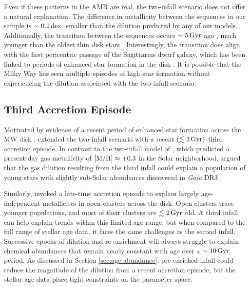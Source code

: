 \documentclass[twocolumn,twocolappendix]{aastex701}
\newcommand{\Gyr}{\,{\rm Gyr}}
\newcommand{\dex}{\,{\rm dex}}
\begin{document}
Even if these patterns in the AMR are real, the two-infall scenario does not offer a natural explanation. The difference in metallicity between the sequences in our sample is $\sim0.2\dex$, smaller than the dilution predicted by any of our models. Additionally, the transition between the sequences occurs $\sim5\Gyr$ ago \citep[matching][]{anders_spectroscopic_2023}, much younger than the oldest thin disk stars \citep{pinsonneault_apokasc-3_2025}. Interestingly, the transition does align with the first pericentric passage of the Sagittarius dwarf galaxy, which has been linked to periods of enhanced star formation in the disk \citep{ruiz-lara_recurrent_2020}. It is possible that the Milky Way has seen multiple episodes of high star formation without experiencing the dilution associated with the two-infall scenario.

\subsection{Third Accretion Episode}

Motivated by evidence of a recent period of enhanced star formation across the MW disk \citep{ruiz-lara_recurrent_2020}, \citet{spitoni_beyond_2023} extended the two-infall scenario with a recent $(\lesssim3\Gyr)$ third accretion episode. In contrast to the two-infall model of \citet{spitoni_apogee_2021}, which predicted a present-day gas metallicity of ${\rm [M/H]}\approx+0.3$ in the Solar neighborhood, \citet{spitoni_beyond_2023} argued that the gas dilution resulting from the third infall could explain a population of young stars with slightly sub-Solar abundances discovered in {\it Gaia} DR3 \citep{recio-blanco_gaia_2023}.

Similarly, \citet{palla_mapping_2024} invoked a late-time accretion episode to explain largely age-independent metallicites in open clusters across the disk. Open clusters trace younger populations, and most of their clusters are $\lesssim2\Gyr$ old. A third infall can help explain trends within this limited age range, but when compared to the full range of stellar age data, it faces the same challenges as the second infall. Successive epochs of dilution and re-enrichment will always struggle to explain chemical abundances that remain nearly constant with age over a $\sim10\Gyr$ period. As discussed in Section \ref{sec:age-abundance}, pre-enriched infall could reduce the magnitude of the dilution from a recent accretion episode, but the stellar age data place tight constraints on the parameter space.
\end{document}
